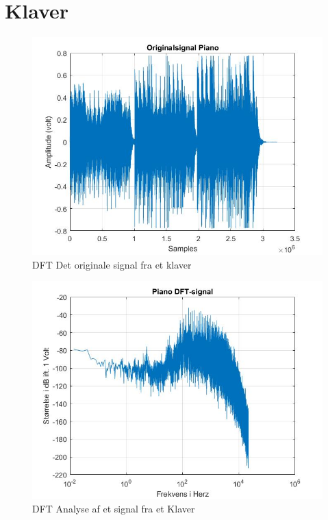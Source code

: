 \section{Klaver}
\begin{figure}[ht!]
	\centering
	\includegraphics[width=180mm]{figures/Piano/original.jpg}
	\caption{DFT Det originale signal fra et klaver}
	\label{fig:Klaver original}
\end{figure}

\begin{figure}[ht!]
	\centering
	\includegraphics[width=180mm]{figures/Piano/DFT.jpg}
	\caption{DFT Analyse af et signal fra et Klaver}
	\label{fig:Klaver DFT}
\end{figure}

